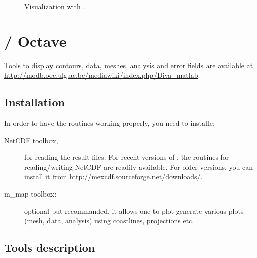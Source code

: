 \begin{figure}[htpb]
\centering
{}

\caption{Visualization with \gnuplot.\label{fig:gnuplotexamples}}
\end{figure}


\section{\matlab / Octave}


Tools to display contours, data, meshes, analysis and error fields are available at \url{http://modb.oce.ulg.ac.be/mediawiki/index.php/Diva_matlab}. 

\subsection{Installation}

In order to have the routines working properly, you need to installe:
\begin{description}
\item[NetCDF toolbox,] for reading the result files. For recent versions of \matlab, the routines for reading/writing NetCDF are readily available. For older versions, you can install it from \url{http://mexcdf.sourceforge.net/downloads/}.
\item[m\_map toolbox:] optional but recommanded, it allows one to plot generate various plots (mesh, data, analysis) using coastlines, projections etc. 
\end{description}
    

\subsection{Tools description}

